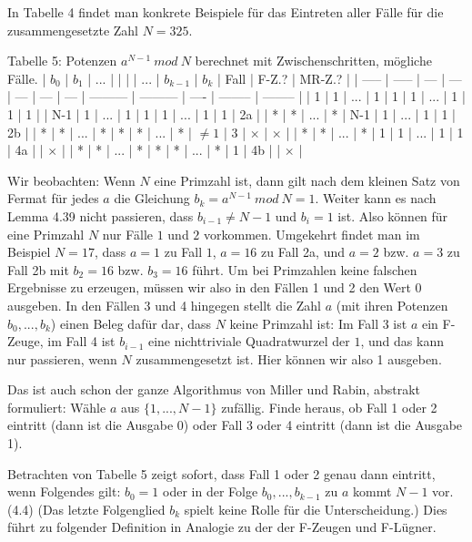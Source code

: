 \documentclass[a4paper]{article}
\begin{document}
\begin{multicols}{3}
In Tabelle 4 findet man konkrete Beispiele für das Eintreten aller Fälle für die zusammengesetzte Zahl $N=325$.

Tabelle 5: Potenzen $a^{N-1}\ mod\ N$ berechnet mit Zwischenschritten, mögliche Fälle.
| $b_0$ | $b_1$ | ... |     |     |     | ... | $b_{k-1}$ | $b_k$     | Fall | F-Z.?    | MR-Z.?   |
| ----- | ----- | --- | --- | --- | --- | --- | --------- | --------- | ---- | -------- | -------- |
| 1     | 1     | ... | 1   | 1   | 1   | ... | 1         | 1         | 1    |
| N-1   | 1     | ... | 1   | 1   | 1   | ... | 1         | 1         | 2a   |
| *     | *     | ... | *   | N-1 | 1   | ... | 1         | 1         | 2b   |
| *     | *     | ... | *   | *   | *   | ... | *         | $\not= 1$ | 3    | $\times$ | $\times$ |
| *     | *     | ... | *   | 1   | 1   | ... | 1         | 1         | 4a   |          | $\times$ |
| *     | *     | ... | *   | *   | *   | ... | *         | 1         | 4b   |          | $\times$ |

Wir beobachten: Wenn $N$ eine Primzahl ist, dann gilt nach dem kleinen Satz von Fermat für jedes $a$ die Gleichung $b_k=a^{N-1}\ mod\ N=1$. Weiter kann es nach Lemma 4.39 nicht passieren, dass $b_{i-1}\not=N-1$ und $b_i=1$ ist. Also können für eine Primzahl $N$ nur Fälle $1$ und $2$ vorkommen. Umgekehrt findet man im Beispiel $N=17$, dass $a=1$ zu Fall $1$, $a=16$ zu Fall 2a, und $a=2$ bzw. $a=3$ zu Fall 2b mit $b_2=16$ bzw. $b_3=16$ führt. Um bei Primzahlen keine falschen Ergebnisse zu erzeugen, müssen wir also in den Fällen 1 und 2 den Wert 0 ausgeben. In den Fällen 3 und 4 hingegen stellt die Zahl $a$ (mit ihren Potenzen $b_0,...,b_k$) einen Beleg dafür dar, dass $N$ keine Primzahl ist: Im Fall 3 ist $a$ ein F-Zeuge, im Fall 4 ist $b_{i-1}$ eine nichttriviale Quadratwurzel der $1$, und das kann nur passieren, wenn $N$ zusammengesetzt ist. Hier können wir also 1 ausgeben.

Das ist auch schon der ganze Algorithmus von Miller und Rabin, abstrakt formuliert: Wähle $a$ aus $\{1,...,N-1\}$ zufällig. Finde heraus, ob Fall 1 oder 2 eintritt (dann ist die Ausgabe 0) oder Fall 3 oder 4 eintritt (dann ist die Ausgabe 1).

Betrachten von Tabelle 5 zeigt sofort, dass Fall 1 oder 2 genau dann eintritt, wenn Folgendes gilt: $b_0=1$ oder in der Folge $b_0,...,b_{k-1}$ zu $a$ kommt $N-1$ vor. (4.4) (Das letzte Folgenglied $b_k$ spielt keine Rolle für die Unterscheidung.) Dies führt zu folgender Definition in Analogie zu der der F-Zeugen und F-Lügner.


\end{multicols}
\end{document}
